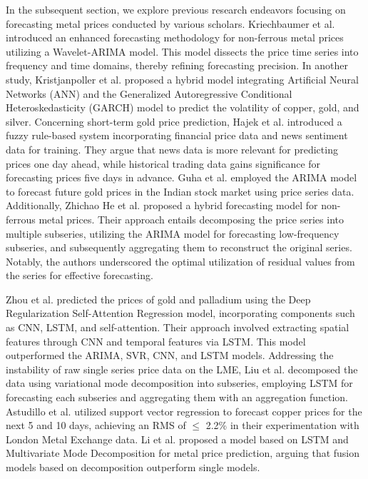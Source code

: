 \documentclass[preprint,12pt]{elsarticle}
\begin{document}
In the subsequent section, we explore previous research endeavors focusing on forecasting metal prices conducted by various scholars. Kriechbaumer et al. \cite{kriechbaumer2014improved} introduced an enhanced forecasting methodology for non-ferrous metal prices utilizing a Wavelet-ARIMA model. This model dissects the price time series into frequency and time domains, thereby refining forecasting precision. In another study, Kristjanpoller et al. \cite{kristjanpoller2017volatility} proposed a hybrid model integrating Artificial Neural Networks (ANN) and the Generalized Autoregressive Conditional Heteroskedasticity (GARCH) model to predict the volatility of copper, gold, and silver. Concerning short-term gold price prediction, Hajek et al. \cite{hajek2022fuzzy} introduced a fuzzy rule-based system incorporating financial price data and news sentiment data for training. They argue that news data is more relevant for predicting prices one day ahead, while historical trading data gains significance for forecasting prices five days in advance. Guha et al. \cite{guha2016gold} employed the ARIMA model to forecast future gold prices in the Indian stock market using price series data. Additionally, Zhichao He et al. \cite{he2023novel} proposed a hybrid forecasting model for non-ferrous metal prices. Their approach entails decomposing the price series into multiple subseries, utilizing the ARIMA model for forecasting low-frequency subseries, and subsequently aggregating them to reconstruct the original series. Notably, the authors underscored the optimal utilization of residual values from the series for effective forecasting.
\par Zhou et al. \cite{zhou2019precious} predicted the prices of gold and palladium using the Deep Regularization Self-Attention Regression model, incorporating components such as CNN, LSTM, and self-attention. Their approach involved extracting spatial features through CNN and temporal features via LSTM. This model outperformed the ARIMA, SVR, CNN, and LSTM models. Addressing the instability of raw single series price data on the LME, Liu et al. \cite{liu2020non} decomposed the data using variational mode decomposition into subseries, employing LSTM for forecasting each subseries and aggregating them with an aggregation function. Astudillo et al. \cite{astudillo2020copper} utilized support vector regression to forecast copper prices for the next 5 and 10 days, achieving an RMS of $\leq$ 2.2\% in their experimentation with London Metal Exchange data. Li et al. \cite{li2023novel} proposed a model based on LSTM and Multivariate Mode Decomposition for metal price prediction, arguing that fusion models based on decomposition outperform single models.
\end{document}
